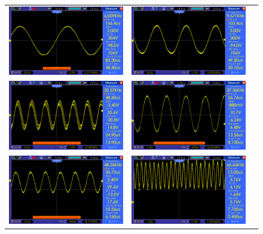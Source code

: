 \documentclass[14pt,a4paper]{extarticle}
\begin{document}
\begin{figure}[H]
\centering
\begin{tabular}{ccc}
    \includegraphics[width=.49\linewidth]{imgs/sine6k.png}&
    \includegraphics[width=.49\linewidth]{imgs/sine10k.png}\\
    \includegraphics[width=.49\linewidth]{imgs/sine20k.png}&
    \includegraphics[width=.49\linewidth]{imgs/sine37k.png}\\
    \includegraphics[width=.49\linewidth]{imgs/sine48k.png}&        
    \includegraphics[width=.49\linewidth]{imgs/sine67k.png}\\

\end{tabular}
\end{figure}
\end{document}
